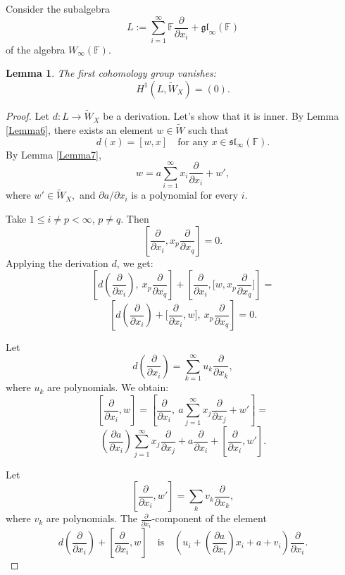 \documentclass[12pt,a4paper]{amsart}
\theoremstyle{plain}
\newtheorem{Lemma}{Lemma}
\begin{document}
	
	Consider the subalgebra 
	\[
	L := \sum_{i=1}^\infty \mathbb{F} \frac{\partial}{\partial x_i} + \mathfrak{gl}_\infty(\mathbb{F})
	\]
	of  the algebra $ W_\infty(\mathbb{F}).$
	
	\begin{Lemma}\label{Lemma8} The first cohomology group vanishes: $$H^1(L, \widetilde{W}_X) = (0).$$ \end{Lemma}
	
	\begin{proof} Let \( d : L \to \widetilde{W}_X \) be a derivation. Let's show that it is inner. By Lemma \ref{Lemma6}, there exists an element \( w \in \widetilde{W} \) such that
		\[
		d(x) = [w, x] \quad \text{for any } x \in \mathfrak{sl}_\infty(\mathbb{F}).
		\] By Lemma \ref{Lemma7}, $$ w = a \sum_{i=1}^\infty x_i \frac{\partial}{\partial x_i} + w',$$ where $ w' \in \widetilde{W}_X , $ and  $\partial a / {\partial x_i}$ is a polynomial for every  $i. $
		
		
		Take \( 1 \leq i \not= p < \infty \), $p\not= q.$ Then
		\[
		\left[ \frac{\partial}{\partial x_i}, x_p \frac{\partial}{\partial x_q} \right] = 0.
		\] Applying the derivation \( d \), we get:
		\[
		\left[ d\left( \frac{\partial}{\partial x_i}\right), \ x_p \frac{\partial}{\partial x_q} \right]
		+ \left[ \frac{\partial}{\partial x_i}, \Big[w, x_p \frac{\partial}{\partial x_q}\Big] \right]
		= \] \[\left[ d\left( \frac{\partial}{\partial x_i} \right) + \Big[\frac{\partial}{\partial x_i}, w\Big], \  x_p \frac{\partial}{\partial x_q} \right] = 0.
		\]
		
		Let
		\[
		d\left( \frac{\partial}{\partial x_i} \right) = \sum_{k=1}^\infty u_k \frac{\partial}{\partial x_k},\] where  $ u_k$  are polynomials.  We obtain: 
		\[
		\left[ \frac{\partial}{\partial x_i}, w \right] = \left[ \frac{\partial}{\partial x_i}, \ a\sum_{j=1}^\infty x_j \frac{\partial}{\partial x_j} +   w' \right]=
		\]
		\[ \left( \frac{\partial a}{\partial x_i}\right)  \sum_{j=1}^\infty x_j \frac{\partial}{\partial x_j} + a  \frac{\partial }{\partial x_i} + \left[ \frac{\partial}{\partial x_i}, w' \right].  \]
		
		
		Let
		\[
		\left[ \frac{\partial}{\partial x_i}, w' \right] = \sum_k v_k \frac{\partial}{\partial x_k}, \] where   $v_k$ are polynomials. The \( \frac{\partial}{\partial x_i} \)-component of the element \[   d\left(\frac{\partial}{\partial x_i}\right) +\left[  \frac{\partial}{\partial x_i}, w\right] \quad \text{is} \quad 
		\left(u_i + \left(\frac{\partial a}{\partial x_i}\right) x_i + a + v_i\right) \frac{\partial}{\partial x_i}.
		\]
		

\end{proof}
\end{document}
